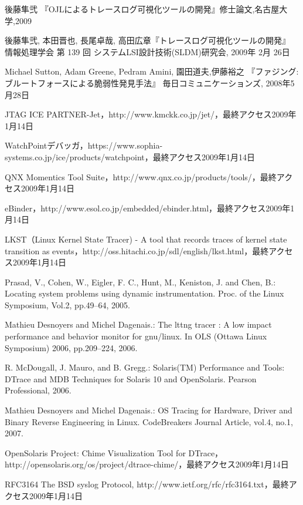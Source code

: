 \documentclass[final,12pt,report]{jsbook}
\begin{document}
\begin{thebibliography}{99}%
 後藤隼弐 『OJLによるトレースログ可視化ツールの開発』修士論文,名古屋大学,2009

後藤隼弐,
本田晋也,
長尾卓哉,
高田広章『トレースログ可視化ツールの開発』
情報処理学会 第 139 回 システムLSI設計技術(SLDM)研究会, 2009年 2月 26日

Michael Sutton, Adam Greene, Pedram Amini, 園田道夫,伊藤裕之
『ファジング:ブルートフォースによる脆弱性発見手法』
毎日コミュニケーションズ, 2008年5月28日

JTAG ICE PARTNER-Jet，http://www.kmckk.co.jp/jet/，最終アクセス2009年1月14日

WatchPointデバッガ，https://www.sophia-systems.co.jp/ice/products/watchpoint，最終アクセス2009年1月14日

QNX Momentics Tool Suite，http://www.qnx.co.jp/products/tools/，最終アクセス2009年1月14日

eBinder，http://www.esol.co.jp/embedded/ebinder.html，最終アクセス2009年1月14日

LKST（Linux Kernel State Tracer) - A tool that records
traces of kernel state transition as events，http://oss.hitachi.co.jp/sdl/english/lkst.html，最終アクセス2009年1月14日

Prasad, V., Cohen, W., Eigler, F. C., Hunt, M., Keniston, J. and Chen, B.: Locating system problems using dynamic instrumentation. Proc. of the Linux Symposium, Vol.2, pp.49–64, 2005.

Mathieu Desnoyers and Michel Dagenais.: The lttng tracer : A low impact performance and behavior monitor for gnu/linux. In OLS (Ottawa Linux Symposium) 2006, pp.209–224, 2006.

R. McDougall, J. Mauro, and B. Gregg.: Solaris(TM) Performance and Tools: DTrace and MDB Techniques for Solaris 10 and OpenSolaris. Pearson Professional, 2006.

Mathieu Desnoyers and Michel Dagenais.: OS Tracing for Hardware, Driver and Binary Reverse Engineering in Linux. CodeBreakers Journal Article, vol.4, no.1, 2007.

OpenSolaris Project: Chime Visualization Tool for DTrace，http://opensolaris.org/os/project/dtrace-chime/，最終アクセス2009年1月14日

RFC3164 The BSD syslog Protocol, http://www.ietf.org/rfc/rfc3164.txt，最終アクセス2009年1月14日


\end{thebibliography}
\end{document}
